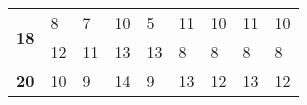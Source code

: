 \begin{table}[!htbp]
{\begin{tabular}{|c|ll|ll|ll|ll|}
\multirow{2}{*}{\textbf{18}}     & \multicolumn{1}{l|}{8}                                                                                  & 7                                                                                                    & \multicolumn{1}{l|}{10}                                                                                 & 5                                                                                                    & \multicolumn{1}{l|}{11}                                                                                 & 10                                                                                                   & \multicolumn{1}{l|}{11}                                                                                 & 10                                                                                                   \\ \cline{2-9} 
                                 & \multicolumn{1}{l|}{12}                                                                                 & 11                                                                                                   & \multicolumn{1}{l|}{13}                                                                                 & 13                                                                                                   & \multicolumn{1}{l|}{8}                                                                                  & 8                                                                                                    & \multicolumn{1}{l|}{8}                                                                                  & 8                                                                                                    \\ \hline
\multirow{2}{*}{\textbf{20}}     & \multicolumn{1}{l|}{10}                                                                                 & 9                                                                                                    & \multicolumn{1}{l|}{14}                                                                                 & 9                                                                                                    & \multicolumn{1}{l|}{13}                                                                                 & 12                                                                                                   & \multicolumn{1}{l|}{13}                                                                                 & 12                                                                                                   \\ \cline{2-9} 

\end{tabular}}
\end{table}
